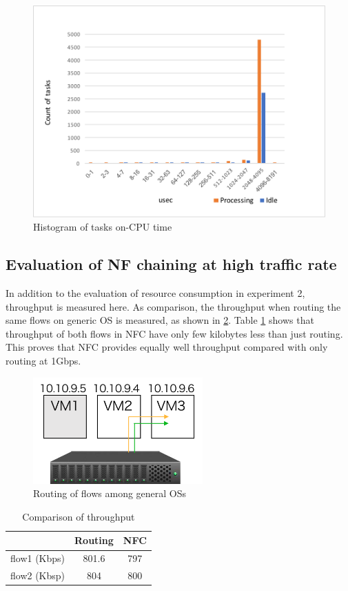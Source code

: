 \begin{figure}
	\centering
	\includegraphics[width=120mm]{pics/cpudist.pdf}
	\caption{Histogram of tasks on-CPU time}
	\label{fig: cpudist}
\end{figure}

\subsection{Evaluation of NF chaining at high traffic rate}
In addition to the evaluation of resource consumption in experiment 2, throughput is measured here. As comparison, the throughput when routing the same flows on generic OS is measured, as shown in \ref{fig: env2}. Table \ref{tbl: throughput} shows that throughput of both flows in NFC have only few kilobytes less than just routing. This proves that NFC provides equally well throughput compared with only routing at 1Gbps.

\begin{figure}
	\centering
	\includegraphics[width=65mm]{pics/env2.pdf}
	\caption{Routing of flows among general OSs}
	\label{fig: env2}
\end{figure}

\begin{table}
	\centering
	\begin{tabular}{|c|c|c|}
	\hline
	 & Routing & NFC \\
	 \hline
	 flow1 (Kbps) & 801.6 & 797 \\
	 \hline
	 flow2 (Kbsp) & 804 & 800 \\
	 \hline
	\end{tabular}
	\caption{Comparison of throughput}
	\label{tbl: throughput}
\end{table}






